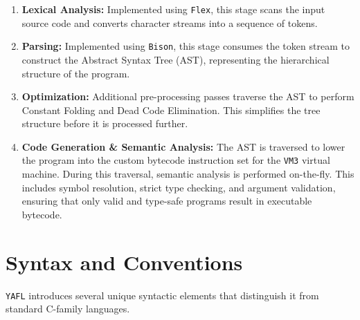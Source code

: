 \documentclass[11pt,a4paper]{article}
\begin{document}
\begin{enumerate}
    \item \textbf{Lexical Analysis:} Implemented using \texttt{Flex}, this stage scans the input source code and converts character streams into a sequence of tokens.
    \item \textbf{Parsing:} Implemented using \texttt{Bison}, this stage consumes the token stream to construct the Abstract Syntax Tree (AST), representing the hierarchical structure of the program.
    \item \textbf{Optimization:} Additional pre-processing passes traverse the AST to perform Constant Folding and Dead Code Elimination.
    This simplifies the tree structure before it is processed further.
    \item \textbf{Code Generation \& Semantic Analysis:} The AST is traversed to lower the program into the custom bytecode instruction set for the \texttt{VM3} virtual machine.
    During this traversal, semantic analysis is performed on-the-fly.
    This includes symbol resolution, strict type checking, and argument validation, ensuring that only valid and type-safe programs result in executable bytecode.
\end{enumerate}

\section{Syntax and Conventions}

\texttt{YAFL} introduces several unique syntactic elements that distinguish it from standard C-family languages.
\end{document}
